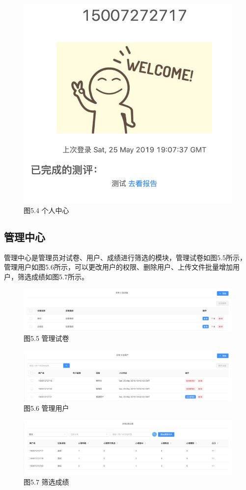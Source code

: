 \begin{figure}[thbp!]
	\centering
	\includegraphics[height=0.35\linewidth]{figure/main}
	\label{fig:main} \\
	图5.4 个人中心
\end{figure}

\subsection{管理中心}

管理中心是管理员对试卷、用户、成绩进行筛选的模块，管理试卷如图5.5所示，管理用户如图5.6所示，可以更改用户的权限、删除用户、上传文件批量增加用户，筛选成绩如图5.7所示。

\begin{figure}[thbp!]
	\centering
	\includegraphics[width=1.0\linewidth]{figure/admin_paper}
	\label{fig:admin_paper} \\
	图5.5 管理试卷
\end{figure}

\begin{figure}[thbp!]
	\centering
	\includegraphics[width=1.0\linewidth]{figure/admin_user}
	\label{fig:admin_user} \\
	图5.6 管理用户
\end{figure}

\begin{figure}[thbp!]
	\centering
	\includegraphics[width=1.0\linewidth]{figure/admin_grade}
	\label{fig:admin_grade} \\
	图5.7 筛选成绩
\end{figure}

